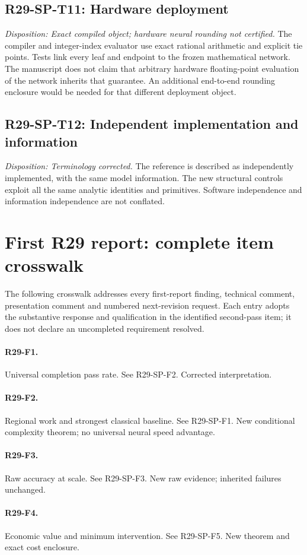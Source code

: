\subsection{R29-SP-T11: Hardware deployment}
\textit{Disposition: Exact compiled object; hardware neural rounding not certified.} The compiler and integer-index evaluator use exact rational arithmetic and explicit tie points. Tests link every leaf and endpoint to the frozen mathematical network. The manuscript does not claim that arbitrary hardware floating-point evaluation of the network inherits that guarantee. An additional end-to-end rounding enclosure would be needed for that different deployment object.
\subsection{R29-SP-T12: Independent implementation and information}
\textit{Disposition: Terminology corrected.} The reference is described as independently implemented, with the same model information. The new structural controls exploit all the same analytic identities and primitives. Software independence and information independence are not conflated.
\section{First R29 report: complete item crosswalk}
The following crosswalk addresses every first-report finding, technical comment, presentation comment and numbered next-revision request. Each entry adopts the substantive response and qualification in the identified second-pass item; it does not declare an uncompleted requirement resolved.
\paragraph{R29-F1.} Universal completion pass rate. See R29-SP-F2. Corrected interpretation.
\paragraph{R29-F2.} Regional work and strongest classical baseline. See R29-SP-F1. New conditional complexity theorem; no universal neural speed advantage.
\paragraph{R29-F3.} Raw accuracy at scale. See R29-SP-F3. New raw evidence; inherited failures unchanged.
\paragraph{R29-F4.} Economic value and minimum intervention. See R29-SP-F5. New theorem and exact cost enclosure.
